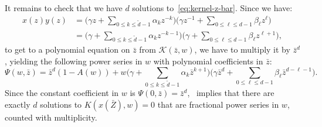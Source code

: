 \documentclass{scrartcl}
\newcommand\wt[1]{\widetilde{#1}}
\begin{document}
It remains to check that we have $d$ solutions to~\eqref{eq:kernel-z-bar}. Since we have:
\begin{align*}
x(z)y(z)&=\Bigg(\gamma z +\sum_{0 \leq k \leq \wt d -1}\alpha_kz^{-k}\Bigg)\Bigg(\gamma z^{-1} +\sum_{0 \leq \ell \leq d -1}\beta_\ell z^{\ell}\Bigg)\\
&=\Bigg(\gamma +\sum_{0 \leq k \leq \wt d -1}\alpha_kz^{-k-1}\Bigg)\Bigg(\gamma +\sum_{0 \leq \ell \leq d -1}\beta_\ell z^{\ell+1}\Bigg),
\end{align*}
to get to a polynomial equation on $\bar{z}$ from $\mathcal{K}(\bar{z},w)$, we have to multiply it by $\bar{z}^d$, yielding the following power series in $w$ with polynomial coefficients in $\bar{z}$:
\[
\Psi(w,\bar{z})=\bar{z}^d(1-A(w))+w\Bigg(\gamma +\sum_{0 \leq k \leq \wt d -1}\alpha_k\bar{z}^{k+1}\Bigg)\Bigg(\gamma \bar{z}^d +\sum_{0 \leq \ell \leq d -1}\beta_\ell \bar{z}^{d-\ell-1}\Bigg).
\]
Since the constant coefficient in $w$ is $\Psi(0,\bar{z})= \bar{z}^d$,~\cite[Theorem 2]{BoJe06} implies that there are exactly $d$ solutions to $K(x(\bar{Z}),w)=0$ that are fractional power series in $w$, counted with multiplicity.


\newpage
\printbibliography
\end{document}
